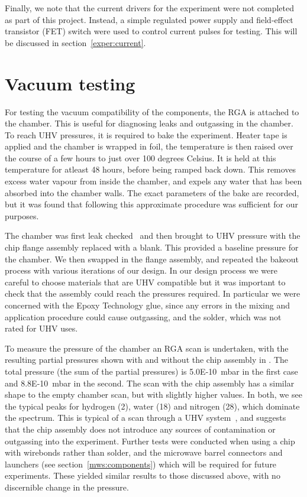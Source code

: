 Finally, we note that the current drivers for the experiment were not completed
as part of this project. Instead, a simple regulated power supply and
field-effect transistor (FET) switch were used to control current pulses for
testing. This will be discussed in section~\ref{exper:current}.

\section{Vacuum testing}

For testing the vacuum compatibility of the components, the RGA is attached to
the chamber. This is useful for diagnosing leaks and outgassing in the chamber.
To reach UHV pressures, it is required to bake the experiment.  Heater tape is
applied and the chamber is wrapped in foil, the temperature is then raised over
the course of a few hours to just over 100 degrees Celsius.  It is held at this
temperature for atleast 48 hours, before being ramped back down. This removes
excess water vapour from inside the chamber, and expels any water that has been
absorbed into the chamber walls. The exact parameters of the bake are recorded,
but it was found that following this approximate procedure was sufficient for
our purposes.

The chamber was first leak checked~\cite{PfeifferVacuum} and then brought to
UHV pressure with the chip flange assembly replaced with a blank. This provided
a baseline pressure for the chamber. We then swapped in the flange assembly,
and repeated the bakeout process with various iterations of our design. In our
design process we were careful to choose materials that are UHV compatible but
it was important to check that the assembly could reach the pressures required.
In particular we were concerned with the Epoxy Technology glue, since any
errors in the mixing and application procedure could cause outgassing, and the
solder, which was not rated for UHV uses.

To measure the pressure of the chamber an RGA scan is undertaken, with the
resulting partial pressures shown with and without the chip assembly in
. The total pressure (the sum of the partial pressures)
is \SI{5.0E-10}{\milli\bar} in the first case and \SI{8.8E-10}{\milli\bar} in
the second.
%
The scan with the chip assembly has a similar shape to the empty
chamber scan, but with slightly higher values.  In both, we see the typical
peaks for hydrogen (2), water (18) and nitrogen (28), which dominate the
spectrum. This is typical of a scan through a UHV system~\cite{PfeifferVacuum},
and suggests that the chip assembly does not introduce any sources of
contamination or outgassing into the experiment.
%
Further tests were conducted when using a chip with wirebonds rather than
solder, and the microwave barrel connectors and launchers (see
section~\ref{mws:components}) which will be required for future experiments.
These yielded similar results to those discussed above, with no discernible
change in the pressure.

